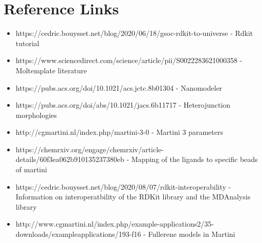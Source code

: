 \documentclass[12pt]{article}
\begin{document}
\section{Reference Links}
\begin{itemize}
\item https://cedric.bouysset.net/blog/2020/06/18/gsoc-rdkit-to-universe - Rdkit tutorial
\item https://www.sciencedirect.com/science/article/pii/S0022283621000358 - Moltemplate literature
\item https://pubs.acs.org/doi/10.1021/acs.jctc.8b01304 - Nanomodeler
\item https://pubs.acs.org/doi/abs/10.1021/jacs.6b11717 - Heterojunction morphologies 
\item http://cgmartini.nl/index.php/martini-3-0 - Martini 3 parameters
\item https://chemrxiv.org/engage/chemrxiv/article-details/60f3ea062b910135237380eb - Mapping of the ligands to specific beads of martini
\item https://cedric.bouysset.net/blog/2020/08/07/rdkit-interoperability - Information on interoperatbility of the RDKit library and the MDAnalysis library
\item http://www.cgmartini.nl/index.php/example-applications2/35-downloads/exampleapplications/193-f16 - Fullerene models in Martini
\end{itemize}



\end{document}
